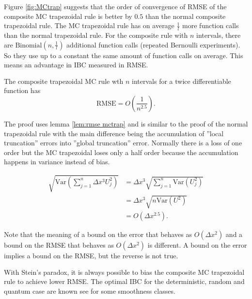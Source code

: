\documentclass[a4paper,12pt]{article}
\begin{document}
Figure \ref{fig:MCtrap} suggests that the order of convergence of RMSE of the
composite MC trapezoidal rule is better by $0.5$ than the normal composite trapezoidal rule.
The MC trapezoidal rule has on average $\frac{1}{l}$ more function calls than
the normal trapezoidal rule. For the composite rule with $n$ intervals,
there are $\text{Binomial}(n,\frac{1}{l})$ additional function calls
(repeated Bernoulli experiments). So they use up to a constant the same amount
of function calls on average. This means an advantage in IBC measured in RMSE. \\

\begin{theorem} \label{thrm:order trap}
    The composite trapezoidal MC rule  wth $n$ intervals
    for a twice differentiable function has
    \begin{equation}
        \text{RMSE} =O\left(\frac{1}{n^{2.5}} \right) .
    \end{equation}

\end{theorem}

The proof uses lemma \ref{lem:rmse mctrap}
and is similar to the proof of the normal
trapezoidal rule with the main difference being  the
accumulation of ''local truncation'' errors into ''global truncation'' error.
Normally there is a loss of one order but the MC trapezoidal loses only a half order
because the accumulation happens in variance instead of bias.

\begin{align}
    \sqrt{\text{Var}\left(\sum_{j=1}^{n}  \Delta x^{3}U_{j}^{2}\right)}
     & = \Delta x^{3} \sqrt{ \sum_{j=1}^{n}\text{Var} (U_{j}^{2})} \\
     & = \Delta x^{3} \sqrt{ n \text{Var}(U^{2})}                  \\
     & = O( \Delta x^{2.5}).
\end{align}

Note that the meaning of a bound on the error that behaves as $O(\Delta x^{2})$ and
a bound on the RMSE that behaves as $O(\Delta x^{2})$ is different.
A bound on the error implies a bound on the RMSE, but
the reverse is not true.

\begin{related}
    With Stein's paradox, it is always possible to bias the composite MC trapezoidal
    rule to achieve lower RMSE.
    The optimal IBC for the deterministic, random and quantum case
    are known see \cite{heinrich_optimal_2001} for some smoothness classes.
\end{related}
\end{document}

